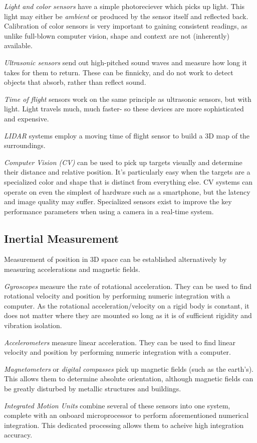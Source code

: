 \begin{asparaenum}[a)]
\item \textit{Light and color sensors} have a simple photoreciever which picks up light. This light may either be \textit{ambient} or produced by the sensor itself and reflected back. Calibration of color sensors is very important to gaining consistent readings, as unlike full-blown computer vision, shape and context are not (inherently) available.
\item \textit{Ultrasonic sensors} send out high-pitched sound waves and measure how long it takes for them to return. These can be finnicky, and do not work to detect objects that absorb, rather than reflect sound.
\item \textit{Time of flight} sensors work on the same principle as ultrasonic sensors, but with light. Light travels much, much faster- so these devices are more sophisticated and expensive.
\item \textit{LIDAR} systems employ a moving time of flight sensor to build a 3D map of the surroundings.
\item \textit{Computer Vision (CV)} can be used to pick up targets visually and determine their distance and relative position. It's particularly easy when the targets are a specialized color and shape that is distinct from everything else. CV systems can operate on even the simplest of hardware such as a smartphone, but the latency and image quality may suffer. Specialized sensors exist to improve the key performance parameters when using a camera in a real-time system.
\end{asparaenum}

\subsection{Inertial Measurement}
Measurement of position in 3D space can be established alternatively by measuring accelerations and magnetic fields.

\begin{asparaenum}[a)]
\item \textit{Gyroscopes} measure the rate of rotational acceleration. They can be used to find rotational velocity and position by performing numeric integration with a computer. As the rotational acceleration/velocity on a rigid body is constant, it does not matter where they are mounted so long as it is of sufficient rigidity and vibration isolation.
\item \textit{Accelerometers} measure linear acceleration. They can be used to find linear velocity and position by performing numeric integration with a computer.
\item \textit{Magnetometers} or \textit{digital compasses} pick up magnetic fields (such as the earth's). This allows them to determine absolute orientation, although magnetic fields can be greatly disturbed by metallic structures and buildings.
\item \textit{Integrated Motion Units} combine several of these sensors into one system, complete with an onboard microprocessor to perform aforementioned numerical integration. This dedicated processing allows them to acheive high integration accuracy.
\end{asparaenum}



